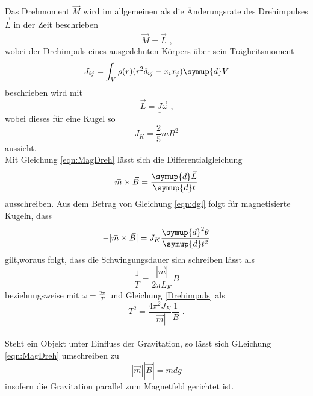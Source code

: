 \noindent Das Drehmoment $\vec{M}$ wird im allgemeinen als die Änderungsrate des Drehimpulses $\vec{L}$ in der Zeit beschrieben
\begin{equation}
    \vec{M}=\dot{\vec{L}}\text{ ,}
\end{equation}
wobei der Drehimpuls eines ausgedehnten Körpers über sein Trägheitsmoment 
\begin{equation}
    J_{ij}=\int_V\rho(r)(r^2\delta_{ij}-x_ix_j)\symup{d}V
\end{equation}
beschrieben wird mit 
\begin{equation}
    \vec{L}=\underline{\underline{J}}\vec{\omega} \text{ ,}
    \label{eqn:Drehimpuls}
\end{equation}
wobei dieses für eine Kugel so
\begin{equation}
    J_K=\frac{2}{5}mR^2
    \label{eqn:trägheit_kugel}
\end{equation}
aussieht. \\

\noindent Mit Gleichung \ref{eqn:MagDreh} lässt sich die Differentialgleichung
\begin{equation}
    \vec{m}\times\vec{B}=\frac{\symup{d}\vec{L}}{\symup{d}t}
    \label{eqn:dgl}
\end{equation}
ausschreiben.
Aus dem Betrag von Gleichung \ref{eqn:dgl} folgt für magnetisierte Kugeln, dass
\begin{equation}
    -|\vec{m}\times\vec{B}|=J_K\frac{\symup{d}^2\theta}{\symup{d}t^2}
    \label{eqn:dglmagmom}
\end{equation}
gilt,woraus folgt, dass die Schwingungsdauer sich schreiben lässt als
\begin{equation}
    \frac{1}{T}=\frac{|\vec{m}|}{2\pi L_K}B
    \label{eqn:schwingdauer1}
\end{equation}
beziehungsweise mit $\omega=\frac{2\pi}{T}$ und Gleichung \ref{Drehimpuls} als
\begin{equation}
    T^2=\frac{4\pi^2J_K}{|\vec{m}|}\frac{1}{B} \text{ .}
    \label{eqn:schwingdauer2}
\end{equation}\\

\noindent Steht ein Objekt unter Einfluss der Gravitation, so lässt sich GLeichung \ref{eqn:MagDreh} umschreiben zu
\begin{equation}
    |\vec{m}||\vec{B}|=mdg
    \label{eqn:dreh_grav}
\end{equation}
insofern die Gravitation parallel zum Magnetfeld gerichtet ist.

